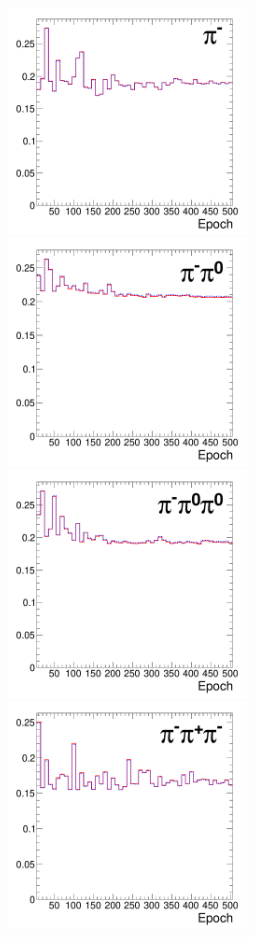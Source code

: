 \begin{figure}[thbp]
   \setlength{\unitlength}{1mm}
   \begin{center}
     \includegraphics*[height=60mm]{tanc_chapter/figures/overtrainCheck_OneProngNoPiZero.pdf}
     \includegraphics*[height=60mm]{tanc_chapter/figures/overtrainCheck_OneProngOnePiZero.pdf}
     \includegraphics*[height=60mm]{tanc_chapter/figures/overtrainCheck_OneProngTwoPiZero.pdf}
     \includegraphics*[height=60mm]{tanc_chapter/figures/overtrainCheck_ThreeProngNoPiZero.pdf}

\end{center}
\end{figure}
